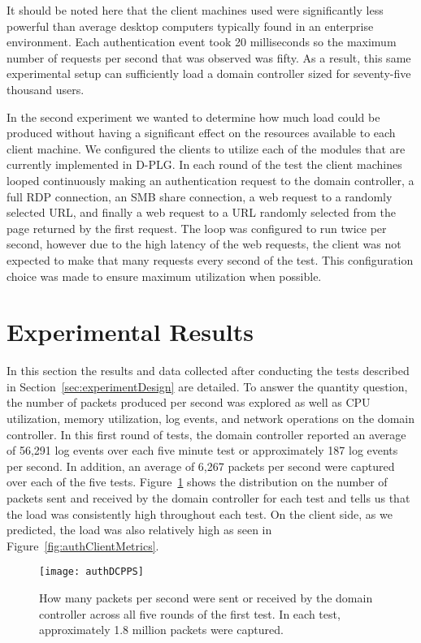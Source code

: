 It should be noted here that the client machines used were significantly less
powerful than average desktop computers typically found in an enterprise
environment.  Each authentication event took 20 milliseconds so the maximum
number of requests per second that was observed was fifty.  As a result, this
same experimental setup can sufficiently load a domain controller sized for
seventy-five thousand users.

In the second experiment we wanted to determine how much load could be produced
without having a significant effect on the resources available to each client
machine.  We configured the clients to utilize each of the modules that are
currently implemented in D-PLG.  In each round of the test the client machines
looped continuously making an authentication request to the domain controller,
a full RDP connection, an SMB share connection, a web request to a randomly
selected URL, and finally a web request to a URL randomly selected from the
page returned by the first request.  The loop was configured to run twice per
second, however due to the high latency of the web requests, the client was not
expected to make that many requests every second of the test.  This
configuration choice was made to ensure maximum utilization when possible.

\section{Experimental Results} \label{sec:results}
In this section the results and data collected after conducting the tests
described in Section~\ref{sec:experimentDesign} are detailed.  To answer the
quantity question, the number of packets produced per second was explored as
well as CPU utilization, memory utilization, log events, and network operations
on the domain controller.  In this first round of tests, the domain controller
reported an average of 56,291 log events over each five minute test or
approximately 187 log events per second.  In addition, an average of 6,267
packets per second were captured over each of the five tests.
Figure~\ref{fig:authDCPPS} shows the distribution on the number of packets sent
and received by the domain controller for each test and tells us that the load
was consistently high throughout each test.  On the client side, as we
predicted, the load was also relatively high as seen in
Figure~\ref{fig:authClientMetrics}.

\begin{figure}[!ht] \centering
  \texttt{[image: authDCPPS]}
  \caption[Domain Controller Packets per Second]{How many packets per second
  were sent or received by the domain controller across all five rounds of the
  first test.  In each test, approximately 1.8 million packets were captured.}
  \label{fig:authDCPPS}
\end{figure}

